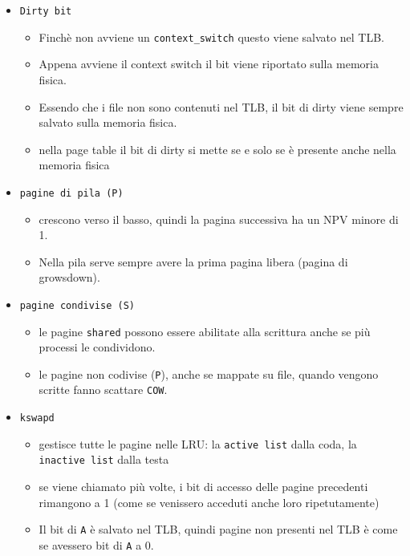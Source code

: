 \documentclass[12pt, a4paper]{report}
\begin{document}
\begin{itemize}
	\item \texttt{Dirty bit}
	      \begin{itemize}
		      \item Finchè non avviene un \texttt{context\_switch} questo viene
		            salvato nel TLB.
		      \item Appena avviene il context switch il bit viene riportato sulla
		            memoria fisica.
		      \item Essendo che i file non sono contenuti nel TLB, il bit di dirty
		            viene sempre salvato sulla memoria fisica.
		      \item nella page table il bit di dirty si mette se e solo se è
		            presente anche nella memoria fisica
	      \end{itemize}
	\item \texttt{pagine di pila (P)}
	      \begin{itemize}
		      \item crescono verso il basso, quindi la pagina successiva ha un NPV
		            minore di 1.
		      \item Nella pila serve sempre avere la prima pagina libera (pagina di
		            growsdown).
	      \end{itemize}
	\item \texttt{pagine condivise (S)}
	      \begin{itemize}
		      \item le pagine \texttt{shared} possono essere abilitate alla
		            scrittura anche se più processi le condividono.
		      \item le pagine non codivise (\texttt{P}), anche se mappate su file,
		            quando vengono scritte fanno scattare \texttt{COW}.
	      \end{itemize}
	\item \texttt{kswapd}
	      \begin{itemize}
		      \item gestisce tutte le pagine nelle LRU: la \texttt{active list}
		            dalla coda, la \texttt{inactive list} dalla testa
		      \item se viene chiamato più volte, i bit di accesso delle pagine
		            precedenti rimangono a 1 (come se venissero acceduti anche loro
		            ripetutamente)
		      \item Il bit di \texttt{A} è salvato nel TLB, quindi pagine non
		            presenti nel TLB è come se avessero bit di \texttt{A} a 0.

\end{itemize}
\end{itemize}
\end{document}
